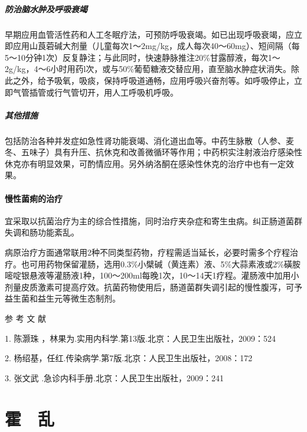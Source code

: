 \paragraph{防治脑水肿及呼吸衰竭}

早期应用血管活性药和人工冬眠疗法，可预防呼吸衰竭。如已出现呼吸衰竭，应立即应用山莨菪碱大剂量（儿童每次1～2mg/kg，成人每次40～60mg）、短间隔（每5～10分钟1次）反复静注；与此同时，快速静脉推注20\%甘露醇液，每次1～2g/kg，4～6小时用药l次，或与50\%葡萄糖液交替应用，直至脑水肿症状消失。除此之外，给予吸氧，吸痰，保持呼吸道通畅，应用呼吸兴奋剂等。如呼吸停止，立即气管插管或行气管切开，用人工呼吸机呼吸。

\paragraph{其他措施}

包括防治各种并发症如急性肾功能衰竭、消化道出血等。中药生脉散（人参、麦冬、五味子）具有升压、抗休克和改善微循环等作用；中药枳实注射液治疗感染性休克亦有明显效果，可酌情应用。另外纳洛酮在感染性休克的治疗中也有一定效果。

\subsubsection{慢性菌痢的治疗}

宜采取以抗菌治疗为主的综合性措施，同时治疗夹杂症和寄生虫病。纠正肠道菌群失调和肠功能紊乱。

病原治疗方面通常联用2种不同类型药物，疗程需适当延长，必要时需多个疗程治疗。也可用药物保留灌肠，选用0.3\%小檗碱（黄连素）液、5\%大蒜素液或2\%磺胺嘧啶银悬液等灌肠液1种，100～200ml每晚1次，10～14天1疗程。灌肠液中加用小剂量皮质激素可提高疗效。抗菌药物使用后，肠道菌群失调引起的慢性腹泻，可予益生菌和益生元等微生态制剂。

\protect\hypertarget{text00228.html}{}{}

\hypertarget{text00228.htmlux5cux23CHP7-9-4}{}
参 考 文 献

1. 陈灏珠 ，林果为.实用内科学.第13版.北京：人民卫生出版社，2009：524

2. 杨绍基，任红.传染病学.第7版.北京：人民卫生出版社，2008：172

3. 张文武 .急诊内科手册.北京：人民卫生出版社，2009：241

\protect\hypertarget{text00229.html}{}{}

\chapter{霍　乱}

